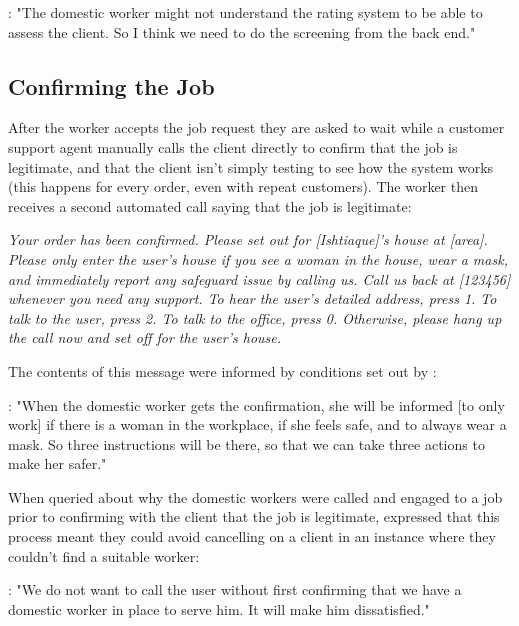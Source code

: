 \begin{displayquote}
\textbf{\PCTwo{}}: "The domestic worker might not understand the rating system to be able to assess the client. So I think we need to do the screening from the back end."
\end{displayquote}


\subsection{Confirming the Job}

After the worker accepts the job request they are asked to wait while a \PC{} customer support agent manually calls the client directly to confirm that the job is legitimate, and that the client isn't simply testing to see how the system works (this happens for every order, even with repeat customers). The worker then receives a second automated call saying that the job is legitimate:

\begin{displayquote}
\textit{Your order has been confirmed. Please set out for [Ishtiaque]’s house at [area]. Please only enter the user’s house if you see a woman in the house, wear a mask, and immediately report any safeguard issue by calling us. Call us back at [123456] whenever you need any support. To hear the user's detailed address, press 1. To talk to the user, press 2. To talk to the office, press 0. Otherwise, please hang up the call now and set off for the user’s house.}
\end{displayquote}

The contents of this message were informed by conditions set out by \NGO{}:

\begin{displayquote}
\textbf{\NGOOne{}}: "When the domestic worker gets the confirmation, she will be informed [to only work] if  there is a woman in the workplace, if she feels safe, and to always wear a mask. So three instructions will be there, so that we can take three actions to make her safer."
\end{displayquote}

When queried about why the domestic workers were called and engaged to a job prior to confirming with the client that the job is legitimate, \PC{} expressed that this process meant they could avoid cancelling on a client in an instance where they couldn't find a suitable worker:

\begin{displayquote}
\textbf{\PCTwo{}}: "We do not want to call the user without first confirming that we have a domestic worker in place to serve him. It will make him dissatisfied."
\end{displayquote}

